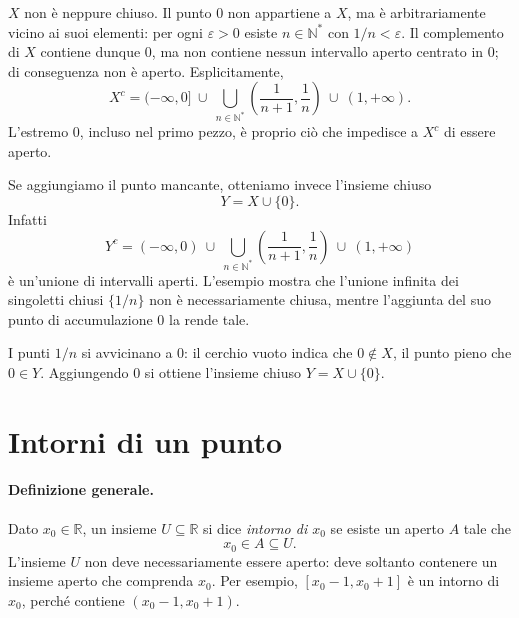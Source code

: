 \documentclass[11pt,a4paper]{article}
\newenvironment{schema}
  {\par\medskip\noindent\begin{minipage}{\linewidth}\centering\small}
  {\end{minipage}\par\medskip}
\newcommand{\R}{\mathbb{R}}
\newcommand{\N}{\mathbb{N}}
\begin{document}
$X$ non è neppure chiuso. Il punto $0$ non appartiene a $X$, ma è
arbitrariamente vicino ai suoi elementi: per ogni $\varepsilon>0$ esiste
$n\in\N^*$ con $1/n<\varepsilon$. Il complemento di $X$ contiene dunque
$0$, ma non contiene nessun intervallo aperto centrato in $0$;
di conseguenza non è aperto. Esplicitamente,
\[
  X^c=(-\infty,0]\ \cup\
  \bigcup_{n\in\N^*}\left(\frac1{n+1},\frac1n\right)
  \ \cup\ (1,+\infty).
\]
L'estremo $0$, incluso nel primo pezzo, è proprio ciò che impedisce a
$X^c$ di essere aperto.

Se aggiungiamo il punto mancante, otteniamo invece l'insieme chiuso
\[
  Y=X\cup\{0\}.
\]
Infatti
\[
  Y^c=(-\infty,0)\ \cup\
  \bigcup_{n\in\N^*}\left(\frac1{n+1},\frac1n\right)
  \ \cup\ (1,+\infty)
\]
è un'unione di intervalli aperti. L'esempio mostra che l'unione infinita
dei singoletti chiusi $\{1/n\}$ non è necessariamente chiusa, mentre
l'aggiunta del suo punto di accumulazione $0$ la rende tale.

\begin{schema}
\par\smallskip
I punti $1/n$ si avvicinano a $0$: il cerchio vuoto indica che
$0\notin X$, il punto pieno che $0\in Y$. Aggiungendo $0$ si ottiene
l'insieme chiuso $Y=X\cup\{0\}$.
\end{schema}

\section{Intorni di un punto}

\paragraph{Definizione generale.}
Dato $x_0\in\R$, un insieme $U\subseteq\R$ si dice \emph{intorno di $x_0$}
se esiste un aperto $A$ tale che
\[
  x_0\in A\subseteq U.
\]
L'insieme $U$ non deve necessariamente essere aperto: deve soltanto
contenere un insieme aperto che comprenda $x_0$. Per esempio,
$[x_0-1,x_0+1]$ è un intorno di $x_0$, perché contiene
$(x_0-1,x_0+1)$.
\end{document}
